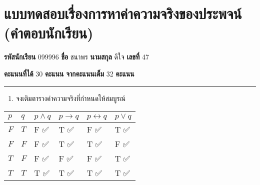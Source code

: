 \documentclass[
  a4paper,
  DIV=11,
  numbers=noendperiod]{scrartcl}
\author{}
\date{}
\providecommand{\tightlist}{%
  \setlength{\itemsep}{0pt}\setlength{\parskip}{0pt}}
\begin{document}
\section{แบบทดสอบเรื่องการหาค่าความจริงของประพจน์
(คำตอบนักเรียน)}\label{uxe41uxe1auxe1auxe17uxe14uxe2auxe2duxe1auxe40uxe23uxe2duxe07uxe01uxe32uxe23uxe2buxe32uxe04uxe32uxe04uxe27uxe32uxe21uxe08uxe23uxe07uxe02uxe2duxe07uxe1buxe23uxe30uxe1euxe08uxe19-uxe04uxe33uxe15uxe2duxe1auxe19uxe01uxe40uxe23uxe22uxe19}

\textbf{รหัสนักเรียน} 099996 \textbf{ชื่อ} ชนาพร \textbf{นามสกุล} ดีใจ
\textbf{เลขที่} 47

\textbf{คะแนนที่ได้} 30 \textbf{คะแนน} \textbf{จากคะแนนเต็ม} 32
\textbf{คะแนน}

\begin{center}\rule{0.5\linewidth}{0.5pt}\end{center}

\begin{enumerate}
\def\labelenumi{\arabic{enumi}.}
\tightlist
\item
  จงเติมตารางค่าความจริงที่กำหนดให้สมบูรณ์
\end{enumerate}

\begin{longtable}[]{@{}
  >{\raggedright\arraybackslash}p{}
  >{\raggedright\arraybackslash}p{}
  >{\raggedright\arraybackslash}p{}
  >{\raggedright\arraybackslash}p{}
  >{\raggedright\arraybackslash}p{}
  >{\raggedright\arraybackslash}p{}@{}}
\toprule\noalign{}
\begin{minipage}[b]{\linewidth}\raggedright
\(p\)
\end{minipage} & \begin{minipage}[b]{\linewidth}\raggedright
\(q\)
\end{minipage} & \begin{minipage}[b]{\linewidth}\raggedright
\(p\land q\)
\end{minipage} & \begin{minipage}[b]{\linewidth}\raggedright
\(p\rightarrow q\)
\end{minipage} & \begin{minipage}[b]{\linewidth}\raggedright
\(p\leftrightarrow q\)
\end{minipage} & \begin{minipage}[b]{\linewidth}\raggedright
\(p\lor q\)
\end{minipage} \\
\midrule\noalign{}
\endhead
\bottomrule\noalign{}
\endlastfoot
\(F\) & \(T\) & F ✅ & T ✅ & F ✅ & T ✅ \\
\(F\) & \(F\) & F ✅ & T ✅ & T ✅ & F ✅ \\
\(T\) & \(F\) & F ✅ & F ✅ & F ✅ & T ✅ \\
\(T\) & \(T\) & T ✅ & T ✅ & T ✅ & T ✅ \\
\end{longtable}
\end{document}
